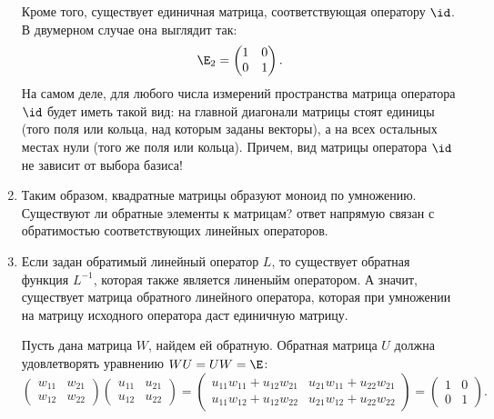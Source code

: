 \begin{enumerate}
Кроме того, существует единичная матрица, соответствующая оператору $\id$. В двумерном случае она выглядит так:
$$
\E_2=\begin{pmatrix}
1 & 0 \\ 0 & 1
\end{pmatrix}.
$$
На самом деле, для любого числа измерений пространства матрица оператора $\id$ будет иметь такой вид: на главной диагонали матрицы стоят единицы (того поля или кольца, над которым заданы векторы), а на всех остальных местах нули (того же поля или кольца). Причем, вид матрицы оператора $\id$ не зависит от выбора базиса!

\item Таким образом, квадратные матрицы образуют моноид по умножению. Существуют ли обратные элементы к матрицам? ответ напрямую связан с обратимостью соответствующих линейных операторов.

\item Если задан обратимый линейный оператор $L$, то существует обратная функция $L^{-1}$, которая также является линеныйм оператором. А значит, существует матрица обратного линейного оператора, которая при умножении на матрицу исходного оператора даст единичную матрицу.

Пусть дана матрица $W$, найдем ей обратную. Обратная матрица $U$ должна удовлетворять уравнению $WU=UW=\E$:
$$
\begin{pmatrix}
w_{11} & w_{21} \\ w_{12} & w_{22}
\end{pmatrix}
\begin{pmatrix}
u_{11} & u_{21} \\ u_{12} & u_{22}
\end{pmatrix}
=
\begin{pmatrix}
u_{11}w_{11} + u_{12}w_{21} & u_{21}w_{11} + u_{22}w_{21} \\ 
u_{11}w_{12} + u_{12}w_{22} & u_{21}w_{12} + u_{22}w_{22}
\end{pmatrix}
=\begin{pmatrix}
1 & 0 \\ 0 & 1
\end{pmatrix}.
$$


\end{enumerate}
